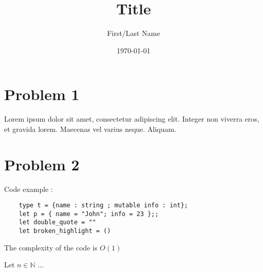 \documentclass{article}
\title{Title}
\date{\today}
\author{First/Last Name}
\newcommand{\bb}[1]{\mathbb{#1}}
\begin{document}


\thispagestyle{firstpage}

\begin{center}
    \huge\bfseries{\@title}
\end{center}

\section{Problem 1}

\begin{question}
\item Lorem ipsum dolor sit amet, consectetur adipiscing elit. Integer non viverra 
eros, et gravida lorem. Maecenas vel varius neque. Aliquam.
\end{question}

\section{Problem 2}

\begin{question}
\item \begin{question}
    \item Code example : 
        \begin{verbatim}
    type t = {name : string ; mutable info : int};
    let p = { name = "John"; info = 23 };;
    let double_quote = ""
    let broken_highlight = ()
        \end{verbatim}
    \item The complexity of the code is $O(1)$
    \end{question}

    \item \begin{question}
        \item Let $n \in \bb{N}$ ...
    \end{question}
\end{question}
\end{document}
